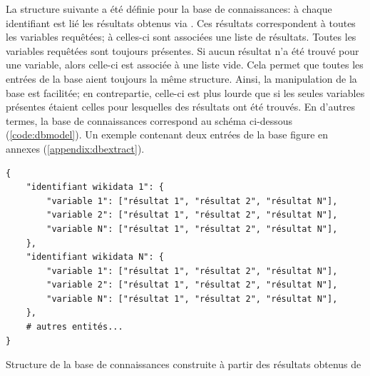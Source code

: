 La structure suivante a été définie pour la base de connaissances: à chaque identifiant \wkd{} est lié les résultats obtenus via \sparql{}. Ces résultats correspondent à toutes les variables requêtées; à celles-ci sont associées une liste de résultats. Toutes les variables requêtées sont toujours présentes. Si aucun résultat n'a été trouvé pour une variable, alors celle-ci est associée à une liste vide. Cela permet que toutes les entrées de la base aient toujours la même structure. Ainsi, la manipulation de la base est facilitée; en contrepartie, celle-ci est plus lourde que si les seules variables présentes étaient celles pour lesquelles des résultats ont été trouvés. En d'autres termes, la base de connaissances correspond au schéma ci-dessous (\ref{code:dbmodel}). Un exemple contenant deux entrées de la base figure en annexes (\ref{appendix:dbextract}).

\begin{listing}[h]
	\begin{verbatim}
{
	"identifiant wikidata 1": {
		"variable 1": ["résultat 1", "résultat 2", "résultat N"],
		"variable 2": ["résultat 1", "résultat 2", "résultat N"],
		"variable N": ["résultat 1", "résultat 2", "résultat N"],
	},
	"identifiant wikidata N": {
		"variable 1": ["résultat 1", "résultat 2", "résultat N"],
		"variable 2": ["résultat 1", "résultat 2", "résultat N"],
		"variable N": ["résultat 1", "résultat 2", "résultat N"],
	},
	# autres entités...
}
	\end{verbatim}
	\caption{Structure de la base de connaissances construite à partir des résultats obtenus de \sparql{}}
	\label{code:dbmodel}
\end{listing}

